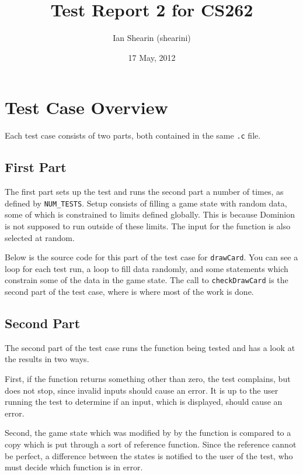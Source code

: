 \documentclass[letterpaper,12pt]{article}
\title{Test Report 2 for CS262}
\date{17 May, 2012}
\author{Ian Shearin (shearini)}
\begin{document}
\maketitle


\section{Test Case Overview}
Each test case consists of two parts, both contained in the same {\tt .c} file.

\subsection{First Part}
The first part sets up the test and runs the second part a number of times, as
defined by {\tt NUM\_TESTS}. Setup consists of filling a game state with
random data, some of which is constrained to limits defined globally. This is
because Dominion is not supposed to run outside of these limits. The input for
the function is also selected at random.

Below is the source code for this part of the test case for {\tt drawCard}. You
can see a loop for each test run, a loop to fill data randomly, and some
statements which constrain some of the data in the game state. The call to
{\tt checkDrawCard} is the second part of the test case, where is where most of
the work is done.

\begin{scriptsize}

\end{scriptsize}

\subsection{Second Part}
The second part of the test case runs the function being tested and has a look
at the results in two ways.

First, if the function returns something other than zero, the test complains,
but does not stop, since invalid inputs should cause an error. It is up to the
user running the test to determine if an input, which is displayed, should
cause an error.

Second, the game state which was modified by by the function is compared to a
copy which is put through a sort of reference function. Since the reference
cannot be perfect, a difference between the states is notified to the user of
the test, who must decide which function is in error.
\end{document}
